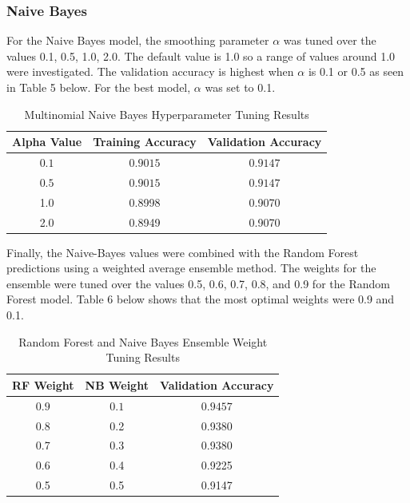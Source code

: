 \documentclass[12pt]{article}
\begin{document}
\subsubsection*{Naive Bayes} For the Naive Bayes model, the smoothing parameter $\alpha$ was tuned over the values 0.1, 0.5, 1.0, 2.0. The default value is 1.0 so a range of values around 1.0 were investigated. The validation accuracy is highest when $\alpha$ is 0.1 or 0.5 as seen in Table 5 below. For the best model, $\alpha$ was set to 0.1.
\begin{table}[h]
    \centering
    \caption{Multinomial Naive Bayes Hyperparameter Tuning Results}
    \label{tab:nb_tuning}
    \begin{tabular}{c c c}
        \hline
        \textbf{Alpha Value} & \textbf{Training Accuracy} & \textbf{Validation Accuracy} \\
        \hline
        $\boxed{0.1}$ & $\boxed{0.9015}$ & $\boxed{0.9147}$ \\
        $\boxed{0.5}$ & $\boxed{0.9015}$ & $\boxed{0.9147}$ \\
        1.0 & 0.8998 & 0.9070 \\
        2.0 & 0.8949 & 0.9070 \\
        \hline
    \end{tabular}
\end{table}

Finally, the Naive-Bayes values were combined with the Random Forest predictions using a weighted average ensemble method. The weights for the ensemble were tuned over the values 0.5, 0.6, 0.7, 0.8, and 0.9 for the Random Forest model. Table 6 below shows that the most optimal weights were 0.9 and 0.1. 

\begin{table}[h]
    \centering
    \caption{Random Forest and Naive Bayes Ensemble Weight Tuning Results}
    \label{tab:ensemble_tuning}
    \begin{tabular}{c c c}
        \hline
        \textbf{RF Weight} & \textbf{NB Weight} & \textbf{Validation Accuracy} \\
        \hline
        $\boxed{0.9}$ & $\boxed{0.1}$ & $\boxed{0.9457}$ \\
        0.8 & 0.2 & 0.9380 \\
        0.7 & 0.3 & 0.9380 \\
        0.6 & 0.4 & 0.9225 \\
        0.5 & 0.5 & 0.9147 \\
        \hline
    \end{tabular}
\end{table}
\end{document}
